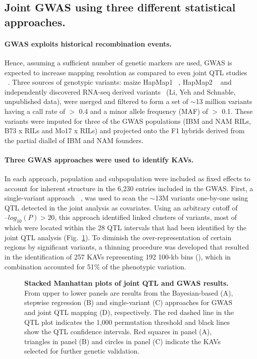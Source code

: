 \documentclass[10pt,letterpaper]{article}
\begin{document}
\subsection*{Joint GWAS using three different statistical approaches.}
\paragraph{GWAS exploits historical recombination events.}
Hence, assuming a sufficient number of genetic markers are used, GWAS is expected to increase mapping resolution as compared to even joint QTL studies ~\cite{Yu2008}. Three sources of genotypic variants: maize HapMap1 ~\cite{Gore2009}, HapMap2 ~\cite{Chia2012} and independently discovered RNA-seq derived variants ~\cite{Barbazuk2007}(Li, Yeh and Schnable, unpublished data), were merged and filtered to form a set of $\sim$13 million variants having a call rate of  $>$ 0.4 and a minor allele frequency (MAF) of  $>$ 0.1. These variants were imputed for three of the GWAS populations (IBM and NAM RILs, B73 x RILs and Mo17 x RILs) and projected onto the F1 hybrids derived from the partial diallel of IBM and NAM founders. 

\paragraph{Three GWAS approaches were used to identify KAVs.}
In each approach, population and subpopulation were included as fixed effects to account for inherent structure in the 6,230 entries included in the GWAS. First, a single-variant approach ~\cite{Manolio2010}, was used to scan the $\sim$13M variants one-by-one using QTL detected in the joint analysis as covariates. Using an arbitrary cutoff of $–log_{10}(P) > 20$, this approach identified linked clusters of variants, most of which were located within the 28 QTL intervals that had been identified by the joint QTL analysis (Fig.~\ref{fig3}). To diminish the over-representation of certain regions by significant variants, a thinning procedure was developed that resulted in the identification of 257 KAVs representing 192 100-kb bins (), which in combination accounted for 51\% of the phenotypic variation.

\begin{figure}[h]
\caption{{\bf Stacked Manhattan plots of joint QTL and GWAS results.}
From upper to lower panels are results from the Bayesian-based (A), stepwise regression (B) and single-variant (C) approaches for GWAS and joint QTL mapping (D), respectively. The red dashed line in the QTL plot indicates the 1,000 permutation threshold and black lines show the QTL confidence intervals. Red squares in panel (A), triangles in panel (B) and circles in panel (C) indicate the KAVs selected for further genetic validation.}
\label{fig3}
\end{figure}
\end{document}
